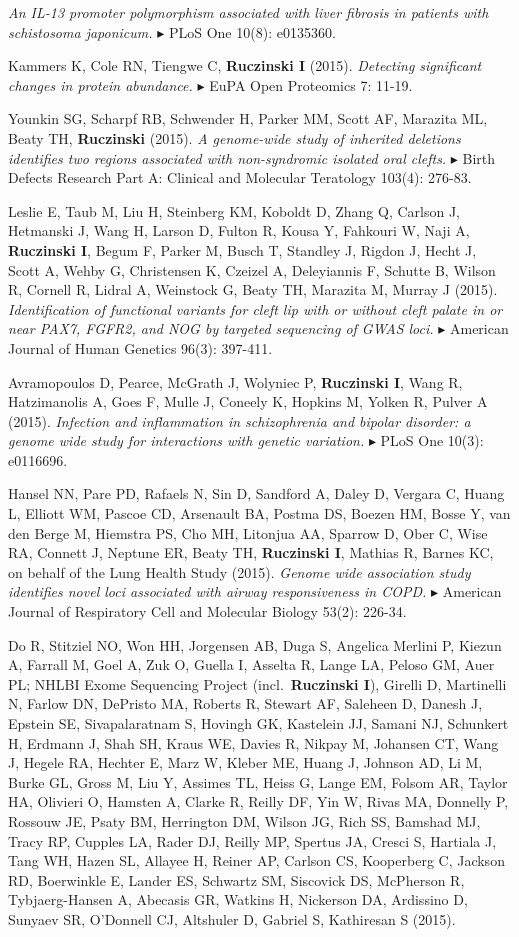 \documentclass[10pt]{article}
\newcommand{\mine}{
  \addtocounter{enumi}{1}
\item[\fcolorbox{white}{grey}{\color{white} \tiny \arabic{enumi}}]
}
\newcommand{\dg}[1]{{\color{black} $\blacktriangleright$ {#1}}}
\begin{document}
{\it An IL-13 promoter polymorphism associated with liver fibrosis in patients with schistosoma japonicum.}
\dg{PLoS One 10(8): e0135360.}
\mine 
Kammers K, Cole RN, Tiengwe C, {\bf Ruczinski I} (2015).
{\it Detecting significant changes in protein abundance.}
\dg{EuPA Open Proteomics 7: 11-19.}
\mine 
Younkin SG, Scharpf RB, Schwender H, Parker MM, Scott AF, Marazita ML, Beaty TH, {\bf Ruczinski} (2015). 
{\it A genome-wide study of inherited deletions identifies two regions associated with non-syndromic isolated oral clefts.}
\dg{Birth Defects Research Part A: Clinical and Molecular Teratology 103(4): 276-83.}
\item 
Leslie E, Taub M, Liu H, Steinberg KM, Koboldt D, Zhang Q, Carlson J, Hetmanski J, Wang H, Larson D, Fulton R, Kousa Y, Fahkouri W, Naji A, {\bf Ruczinski I}, Begum F, Parker M, Busch T, Standley J, Rigdon J, Hecht J, Scott A, Wehby G, Christensen K, Czeizel A, Deleyiannis F, Schutte B, Wilson R, Cornell R, Lidral A, Weinstock G, Beaty TH, Marazita M, Murray J (2015).
{\it Identification of functional variants for cleft lip with or without cleft palate in or near PAX7, FGFR2, and NOG by targeted sequencing of GWAS loci.}
\dg{American Journal of Human Genetics 96(3): 397-411.}
\item 
Avramopoulos D, Pearce, McGrath J, Wolyniec P, {\bf Ruczinski I}, Wang R, Hatzimanolis A, Goes F, Mulle J, Coneely K, Hopkins M, Yolken R, Pulver A (2015).
{\it Infection and inflammation in schizophrenia and bipolar disorder: a genome wide study for interactions with genetic variation.}
\dg{PLoS One 10(3): e0116696.}
\item 
Hansel NN, Pare PD, Rafaels N, Sin D, Sandford A, Daley D, Vergara C, Huang L, Elliott WM, Pascoe CD, Arsenault BA, Postma DS, Boezen HM, Bosse Y, van den Berge M, Hiemstra PS, Cho MH, Litonjua AA, Sparrow D, Ober C, Wise RA, Connett J, Neptune ER, Beaty TH, {\bf Ruczinski I}, Mathias R, Barnes KC, on behalf of the Lung Health Study (2015).
{\it Genome wide association study identifies novel loci associated with airway responsiveness in COPD.}
\dg{American Journal of Respiratory Cell and Molecular Biology 53(2): 226-34.}
\item
Do R, Stitziel NO, Won HH, Jorgensen AB, Duga S, Angelica Merlini P, Kiezun A, Farrall M, Goel A, Zuk O, Guella I, Asselta R, Lange LA, Peloso GM, Auer PL; NHLBI Exome Sequencing Project (incl.~{\bf Ruczinski I}), Girelli D, Martinelli N, Farlow DN, DePristo MA, Roberts R, Stewart AF, Saleheen D, Danesh J, Epstein SE, Sivapalaratnam S, Hovingh GK, Kastelein JJ, Samani NJ, Schunkert H, Erdmann J, Shah SH, Kraus WE, Davies R, Nikpay M, Johansen CT, Wang J, Hegele RA, Hechter E, Marz W, Kleber ME, Huang J, Johnson AD, Li M, Burke GL, Gross M, Liu Y, Assimes TL, Heiss G, Lange EM, Folsom AR, Taylor HA, Olivieri O, Hamsten A, Clarke R, Reilly DF, Yin W, Rivas MA, Donnelly P, Rossouw JE, Psaty BM, Herrington DM, Wilson JG, Rich SS, Bamshad MJ, Tracy RP, Cupples LA, Rader DJ, Reilly MP, Spertus JA, Cresci S, Hartiala J, Tang WH, Hazen SL, Allayee H, Reiner AP, Carlson CS, Kooperberg C, Jackson RD, Boerwinkle E, Lander ES, Schwartz SM, Siscovick DS, McPherson R, Tybjaerg-Hansen A, Abecasis GR, Watkins H, Nickerson DA, Ardissino D, Sunyaev SR, O'Donnell CJ, Altshuler D, Gabriel S, Kathiresan S (2015).
\end{document}
